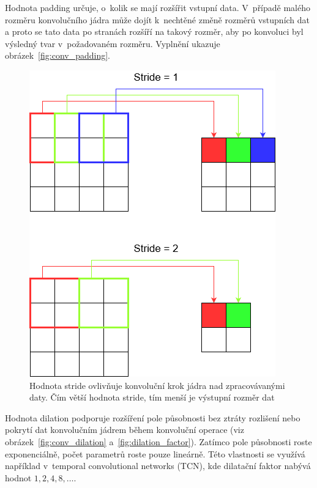 Hodnota padding určuje, o~kolik se mají rozšířit vstupní data. V~případě malého rozměru konvolučního jádra může dojít k~nechtěné změně rozměrů vstupních dat a proto se tato data po stranách rozšíří na takový rozměr, aby po konvoluci byl výsledný tvar v~požadovaném rozměru. Vyplnění ukazuje obrázek~\ref{fig:conv_padding}.


\begin{figure}[H]
    \centering
    \includegraphics[scale=0.5]{obrazky-figures/stride.png}
    \caption{\label{fig:conv_stride}Hodnota stride ovlivňuje konvoluční krok jádra nad zpracovávanými daty. Čím větší hodnota stride, tím menší je výstupní rozměr dat}
\end{figure}


Hodnota dilation podporuje rozšíření pole působnosti bez ztráty rozlišení nebo pokrytí dat konvolučním jádrem během konvoluční operace (viz obrázek~\ref{fig:conv_dilation} a~\ref{fig:dilation_factor}). Zatímco pole působnosti roste exponenciálně, počet parametrů roste pouze lineárně. Této vlastnosti se využívá například v~temporal convolutional networks (TCN), kde dilatační faktor nabývá hodnot $1, 2, 4, 8, \dots$.

